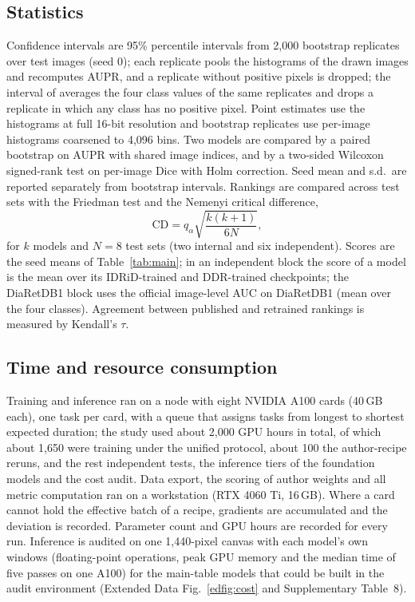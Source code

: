 \subsection{Statistics}
Confidence intervals are 95\% percentile intervals from 2,000 bootstrap replicates over test images (seed 0); each replicate pools the histograms of the drawn images and recomputes AUPR, and a replicate without positive pixels is dropped; the interval of \mAUPR{} averages the four class values of the same replicates and drops a replicate in which any class has no positive pixel. Point estimates use the histograms at full 16-bit resolution and bootstrap replicates use per-image histograms coarsened to 4,096 bins. Two models are compared by a paired bootstrap on AUPR with shared image indices, and by a two-sided Wilcoxon signed-rank test on per-image Dice with Holm correction. Seed mean and s.d.\ are reported separately from bootstrap intervals. Rankings are compared across test sets with the Friedman test and the Nemenyi critical difference\cite{demsar2006statistical},
\begin{equation}
\mathrm{CD}=q_{\alpha}\sqrt{\frac{k(k+1)}{6N}} ,
\end{equation}
for $k$ models and $N=8$ test sets (two internal and six independent). Scores are the seed means of Table~\ref{tab:main}; in an independent block the score of a model is the mean over its IDRiD-trained and DDR-trained checkpoints; the DiaRetDB1 block uses the official image-level AUC on DiaRetDB1 (mean over the four classes). Agreement between published and retrained rankings is measured by Kendall's $\tau$.

\subsection{Time and resource consumption}
Training and inference ran on a node with eight NVIDIA A100 cards (40\,GB each), one task per card, with a queue that assigns tasks from longest to shortest expected duration; the study used about 2,000 GPU hours in total, of which about 1,650 were training under the unified protocol, about 100 the author-recipe reruns, and the rest independent tests, the inference tiers of the foundation models and the cost audit. Data export, the scoring of author weights and all metric computation ran on a workstation (RTX 4060 Ti, 16\,GB). Where a card cannot hold the effective batch of a recipe, gradients are accumulated and the deviation is recorded. Parameter count and GPU hours are recorded for every run. Inference is audited on one 1,440-pixel canvas with each model's own windows (floating-point operations, peak GPU memory and the median time of five passes on one A100) for the  main-table models that could be built in the audit environment (Extended Data Fig.~\ref{edfig:cost} and Supplementary Table~8).

